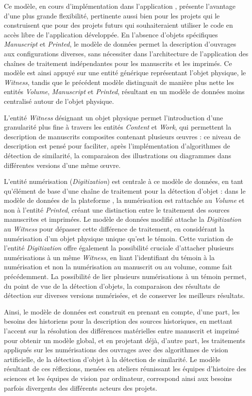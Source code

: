     Ce modèle, en cours d'implémentation dans l'application \eida, présente l'avantage d'une plus grande flexibilité, pertinente aussi bien pour les projets qui le construisent que pour des projets futurs qui souhaiteraient utiliser le code en accès libre de l'application développée. En l'absence d'objets spécifiques \textit{Manuscript} et \textit{Printed}, le modèle de données permet la description d'ouvrages aux configurations diverses, sans nécessiter dans l'architecture de l'application des chaînes de traitement indépendantes pour les manuscrits et les imprimés. Ce modèle est ainsi appuyé sur une entité générique représentant l’objet physique, le \textit{Witness}, tandis que le précédent modèle distinguait de manière plus nette les entités \textit{Volume}, \textit{Manuscript} et \textit{Printed}, résultant en un modèle de données moins centralisé autour de l'objet physique.
    
    L'entité \textit{Witness} désignant un objet physique permet l'introduction d'une granularité plus fine à travers les entités \textit{Content} et \textit{Work}, qui permettent la description de manuscrits composites contenant plusieurs œuvres : ce niveau de description est pensé pour faciliter, après l'implémentation d'algorithmes de détection de similarité, la comparaison des illustrations ou diagrammes dans différentes versions d'une même œuvre.
    
    L'entité numérisation (\textit{Digitization}) est centrale à ce modèle de données, en tant qu'élément de base d'une chaîne de traitement pour la détection d'objet : dans le modèle de données de la plateforme \vhs, la numérisation est rattachée au \textit{Volume} et non à l'entité \textit{Printed}, créant une distinction entre le traitement des sources manuscrites et imprimées. Le modèle de données modifié attache la \textit{Digitization} au \textit{Witness} pour dépasser cette différence de traitement, en considérant la numérisation d'un objet physique unique qu'est le témoin. Cette variation de l'entité \textit{Digitization} offre également la possibilité cruciale d'attacher plusieurs numérisations à un même \textit{Witness}, en liant l'identifiant du témoin à la numérisation et non la numérisation au manuscrit ou au volume, comme fait précédemment. La possibilité de lier plusieurs numérisations à un témoin permet, du point de vue de la détection d'objets, la comparaison des résultats de détection sur diverses versions numérisées, et de conserver les meilleurs résultats.
    
    Ainsi, le modèle de données est construit en prenant en compte, d'une part, les besoins des historiens pour la description des sources historiques, en mettant l'accent sur la résolution des différences matérielles entre manuscrit et imprimé pour obtenir un modèle global, et en projetant déjà, d'autre part, les traitements appliqués sur les numérisations des ouvrages avec des algorithmes de vision artificielle, de la détection d'objet à la détection de similarité. Le modèle résultant de ces réflexions, menées en ateliers réunissant les équipes d'histoire des sciences et les équipes de vision par ordinateur, correspond ainsi aux besoins parfois divergents des différents acteurs des projets.

